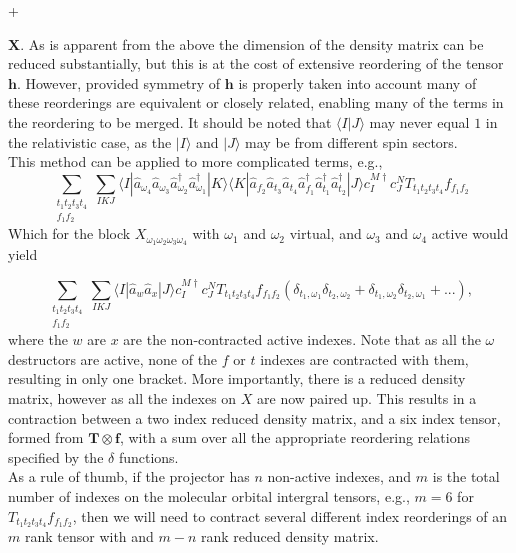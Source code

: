 +\documentclass[12pt]{article}
\begin{document}
$\mathbf{X}$. As is apparent from the above the dimension of the density matrix
can be reduced substantially, but this is at the cost of extensive reordering
of the tensor $\mathbf{h}$. However, provided symmetry of $\mathbf{h}$ is
properly taken into account many of these reorderings are equivalent or closely
related, enabling many of the terms in the reordering to be merged. It should
be noted that $\langle I | J \rangle $ may never equal $1$ in the relativistic
case, as the $ | I\rangle $ and $| J \rangle $ may be from different spin
sectors.\\ 

\noindent This method can be applied to more complicated terms, e.g.,
\begin{equation}
\sum_{ \substack{t_{1}t_{2}t_{3}t_{4}\\ f_{1}f_{2}}} 
\sum_{IKJ}
\langle I |
\hat{a}_{\omega_{4}} \hat{a}_{\omega_{3}}\hat{a}^{\dagger}_{\omega_{2}}\hat{a}^{\dagger}_{\omega_{1}}
| K \rangle \langle K | 
\hat{a}_{f_{2}}\hat{a}_{t_{3}}\hat{a}_{t_{4}}\hat{a}^{\dagger}_{f_{1}}\hat{a}^{\dagger}_{t_{1}} \hat{a}^{\dagger}_{t_{2}}| J \rangle  
c^{M \dagger}_{I}c^{N}_{J} T_{t_{1}t_{2}t_{3}t_{4}}f_{f_{1}f_{2}}
\label{eqn:X_RI_fT_anti_normal1}
\end{equation}
Which for the block $X_{\omega_{1}\omega_{2}\omega_{3}\omega_{4}}$ with 
$\omega_{1}$ and $\omega_{2}$ virtual, and $\omega_{3}$ and $\omega_{4}$ active would yield 

\begin{equation}
\sum_{ \substack{t_{1}t_{2}t_{3}t_{4}\\ f_{1}f_{2}}} 
\sum_{IKJ}
\langle I | \hat{a}_{w}\hat{a}_{x}| J \rangle  
c^{M \dagger}_{I}c^{N}_{J} T_{t_{1}t_{2}t_{3}t_{4}}f_{f_{1}f_{2}}
( \delta_{t_{1},\omega_{1}}\delta_{t_{2},\omega_{2}} +  \delta_{t_{1},\omega_{2}}\delta_{t_{2},\omega_{1}} + ... ),
\label{eqn:XfTend}
\end{equation}
\noindent where the $w$ are $x$  are the non-contracted active indexes.
Note that as all the $\omega$ destructors are active, none of the $f$ or $t$ indexes are contracted with them,
resulting in only one bracket. More importantly, there is a reduced density matrix, however as all the indexes on
$X$ are now paired up. This results in a contraction between a two index reduced density matrix, and a six index
tensor, formed from $\mathbf{T}\otimes\mathbf{f}$, with a sum over all the appropriate reordering relations 
specified by the $\delta$ functions. \\ 

\noindent As a rule of thumb, if the projector has $n$ non-active indexes, and $m$ is the total number of indexes on the molecular orbital intergral tensors, e.g.,
$m=6$ for $T_{t_{1}t_{2}t_{3}t_{4}}f_{f_{1}f_{2}}$, then we will need to contract several different index reorderings of an $m$ rank tensor with and $m-n$ rank reduced density matrix. 
\end{document}
